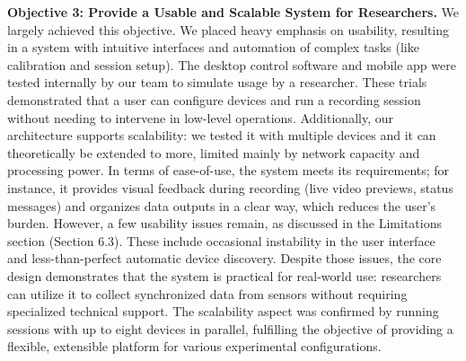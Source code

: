 \textbf{Objective 3: Provide a Usable and Scalable System for Researchers.} We largely achieved this objective. We placed heavy emphasis on usability, resulting in a system with intuitive interfaces and automation of complex tasks (like calibration and session setup). The desktop control software and mobile app were tested internally by our team to simulate usage by a researcher. These trials demonstrated that a user can configure devices and run a recording session without needing to intervene in low-level operations. Additionally, our architecture supports scalability: we tested it with multiple devices and it can theoretically be extended to more, limited mainly by network capacity and processing power. In terms of ease-of-use, the system meets its requirements; for instance, it provides visual feedback during recording (live video previews, status messages) and organizes data outputs in a clear way, which reduces the user's burden. However, a few usability issues remain, as discussed in the Limitations section (Section 6.3). These include occasional instability in the user interface and less-than-perfect automatic device discovery. Despite those issues, the core design demonstrates that the system is practical for real-world use: researchers can utilize it to collect synchronized data from sensors without requiring specialized technical support. The scalability aspect was confirmed by running sessions with up to eight devices in parallel, fulfilling the objective of providing a flexible, extensible platform for various experimental configurations.

